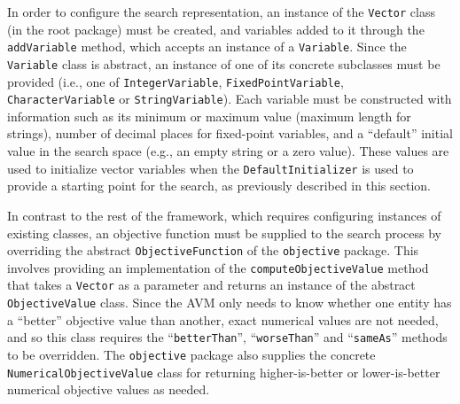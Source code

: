\documentclass{llncs}
\newcommand{\inlineheading}[1]{\vspace{1mm} \noindent {\bf #1.}}
\begin{document}
\begin{sloppypar}
\inlineheading{Representation} In order to configure the search representation, an instance of the {\tt Vector} class (in the root package) must be created, and variables added to it through the {\tt addVariable} method, which accepts an instance of a {\tt Variable}. Since the {\tt Variable} class is abstract, an instance of one of its concrete subclasses must be provided (i.e., one of {\tt IntegerVariable}, {\tt FixedPointVariable}, {\tt CharacterVariable} or {\tt StringVariable}). Each variable must be constructed with information such as its minimum or maximum value (maximum length for strings), number of decimal places for fixed-point variables, and a ``default'' initial value in the search space (e.g., an empty string or a zero value). These values are used to initialize vector variables when the {\tt DefaultInitializer} is used to provide a starting point for the search, as previously described in this section.
\end{sloppypar}


\begin{sloppypar} \inlineheading{Objective Function} In contrast to the rest of the framework, which requires configuring instances of existing classes, an objective function must be supplied to the search process by overriding the abstract {\tt ObjectiveFunction} of the {\tt objective} package. This involves providing an implementation of the {\tt computeObjectiveValue} method that takes a {\tt Vector} as a parameter and returns an instance of the abstract {\tt ObjectiveValue} class. Since the AVM only needs to know whether one entity has a ``better'' objective value than another, exact numerical values are not needed, and so this class requires the ``{\tt betterThan}'', ``{\tt worseThan}'' and ``{\tt sameAs}'' methods to be overridden.
The {\tt objective} package also supplies the concrete {\tt NumericalObjectiveValue} class for returning higher-is-better or lower-is-better numerical objective values as needed.
\end{sloppypar}
\end{document}

